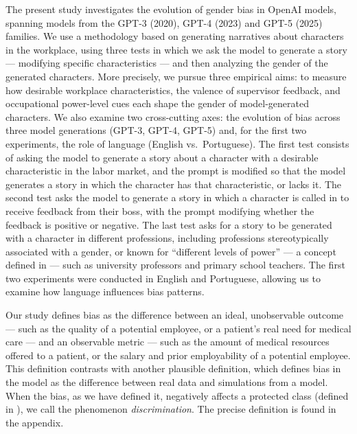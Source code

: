 \documentclass[12pt,a4paper]{article}
\begin{document}
The present study investigates the evolution of gender bias in OpenAI models, spanning models from the GPT-3 (2020), GPT-4 (2023) and
GPT-5 (2025) families. We use a methodology based on generating narratives about characters in the workplace, using three tests in which we ask the model to generate a story --- modifying specific characteristics --- and then analyzing the gender of the generated characters. More precisely, we pursue three empirical aims: to measure how desirable workplace characteristics, the valence of supervisor feedback, and occupational power-level cues each shape the gender of model-generated characters. We also examine two cross-cutting axes: the evolution of bias across three model generations (GPT-3, GPT-4, GPT-5) and, for the first two experiments, the role of language (English vs.\ Portuguese). The first test consists of asking the model to generate a story about a character with a desirable characteristic in the labor market, and the prompt is modified so that the model generates a story in which the character has that characteristic, or lacks it. The second test asks the model to generate a story in which a character is called in to receive feedback from their boss, with the prompt modifying whether the feedback is positive or negative. The last test asks for a story to be generated with a character in different professions, including professions stereotypically associated with a gender, or known for ``different levels of power'' --- a concept defined in
\citet{lucy2021} --- such as university professors and primary school teachers. The first two experiments were conducted in English and Portuguese, allowing us to examine how language influences bias patterns.

Our study defines bias as the difference between an ideal, unobservable outcome --- such as the quality of a potential employee, or a patient's real need for medical care --- and an observable metric --- such as the amount of medical resources offered to a patient, or the salary and prior employability of a potential employee. This definition contrasts with another plausible definition, which defines bias in the model as the difference between real data and simulations from a model. When the bias, as we have defined it, negatively affects a protected class
(defined in \citealp{heymann2021}), we call the phenomenon
\textit{discrimination}. The precise definition is found in the appendix.
\end{document}
